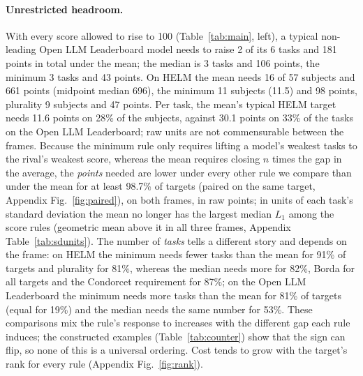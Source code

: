 \paragraph{Unrestricted headroom.}
With every score allowed to rise to 100 (Table~\ref{tab:main}, left), a typical non-leading Open LLM Leaderboard model needs to raise 2 of its 6 tasks and 181 points in total under the mean; the median is 3 tasks and 106 points, the minimum 3 tasks and 43 points. On HELM the mean needs 16 of 57 subjects and 661 points (midpoint median 696), the minimum 11 subjects (11.5) and 98 points, plurality 9 subjects and 47 points. Per task, the mean's typical HELM target needs 11.6 points on 28\% of the subjects, against 30.1 points on 33\% of the tasks on the Open LLM Leaderboard; raw units are not commensurable between the frames. Because the minimum rule only requires lifting a model's weakest tasks to the rival's weakest score, whereas the mean requires closing $n$ times the gap in the average, the \emph{points} needed are lower under every other rule we compare than under the mean for at least 98.7\% of targets (paired on the same target, Appendix Fig.~\ref{fig:paired}), on both frames, in raw points; in units of each task's standard deviation the mean no longer has the largest median $L_1$ among the score rules (geometric mean above it in all three frames, Appendix Table~\ref{tab:sdunits}). The number of \emph{tasks} tells a different story and depends on the frame: on HELM the minimum needs fewer tasks than the mean for 91\% of targets and plurality for 81\%, whereas the median needs more for 82\%, Borda for all targets and the Condorcet requirement for 87\%; on the Open LLM Leaderboard the minimum needs more tasks than the mean for 81\% of targets (equal for 19\%) and the median needs the same number for 53\%. These comparisons mix the rule's response to increases with the different gap each rule induces; the constructed examples (Table~\ref{tab:counter}) show that the sign can flip, so none of this is a universal ordering. Cost tends to grow with the target's rank for every rule (Appendix Fig.~\ref{fig:rank}).

